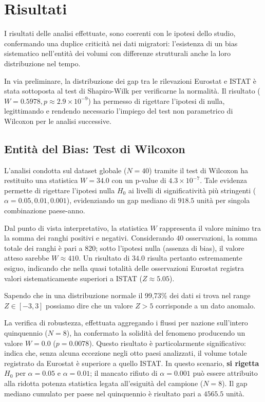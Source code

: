 \section{Risultati}\label{sec:risultati}

I risultati delle analisi effettuate, sono coerenti con le ipotesi dello studio, confermando una duplice criticità nei dati migratori: l'esistenza di un bias sistematico nell'entità dei volumi con differenze strutturali anche la loro distribuzione nel tempo.

In via preliminare, la distribuzione dei gap tra le rilevazioni Eurostat e ISTAT è stata sottoposta al test di Shapiro-Wilk per verificarne la normalità. 
Il risultato ($W = 0.5978, p \approx 2.9 \times 10^{-9}$) ha permesso di rigettare l'ipotesi di nulla, legittimando e rendendo necessario l'impiego del test non parametrico di Wilcoxon per le analisi successive.

\subsection{Entità del Bias: Test di Wilcoxon}

L'analisi condotta sul dataset globale ($N = 40$) tramite il test di Wilcoxon ha restituito una statistica $W = 34.0$ con un p-value di $4.3 \times 10^{-7}$.
Tale evidenza permette di rigettare l'ipotesi nulla $H_0$ ai livelli di significatività più stringenti ($\alpha = 0.05, 0.01, 0.001$), evidenziando un gap mediano di $918.5$ unità per singola combinazione paese-anno.

Dal punto di vista interpretativo, la statistica $W$ rappresenta il valore minimo tra la somma dei ranghi positivi e negativi. 
Considerando 40 osservazioni, la somma totale dei ranghi è pari a 820; sotto l'ipotesi nulla (assenza di bias), il valore atteso sarebbe $W \approx 410$. 
Un risultato di $34.0$ risulta pertanto estremamente esiguo, indicando che nella quasi totalità delle osservazioni Eurostat registra valori sistematicamente superiori a ISTAT ($Z \approx 5.05$).

Sapendo che in una distribuzione normale il 99,73\% dei dati si trova nel range $Z \in [-3, 3]$ possiamo dire che un valore $Z > 5$ corrisponde a un dato anomalo.

La verifica di robustezza, effettuata aggregando i flussi per nazione sull'intero quinquennio ($N = 8$), ha confermato la solidità del fenomeno producendo un valore $W = 0.0$ ($p = 0.0078$). 
Questo risultato è particolarmente significativo: indica che, senza alcuna eccezione negli otto paesi analizzati, il volume totale registrato da Eurostat è superiore a quello ISTAT. 
In questo scenario, \textbf{si rigetta $H_0$} per $\alpha = 0.05$ e $\alpha = 0.01$; il mancato rifiuto di $\alpha = 0.001$ può essere attribuito alla ridotta potenza statistica legata all'esiguità del campione ($N = 8$). 
Il gap mediano cumulato per paese nel quinquennio è risultato pari a $4565.5$ unità.

